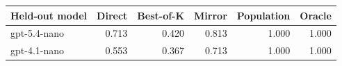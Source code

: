 \begin{tabular}{lrrrrr}
\toprule
Held-out model & Direct & Best-of-K & Mirror & Population & Oracle \\
\midrule
gpt-5.4-nano & 0.713 & 0.420 & 0.813 & 1.000 & 1.000 \\
gpt-4.1-nano & 0.553 & 0.367 & 0.713 & 1.000 & 1.000 \\
\bottomrule
\end{tabular}

